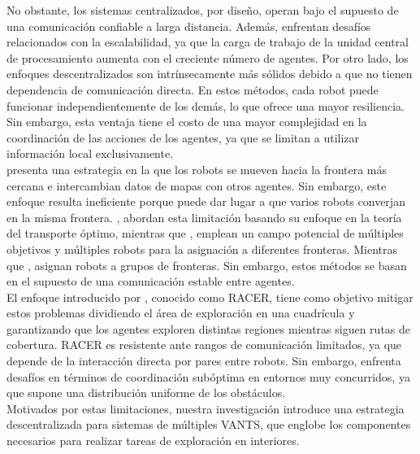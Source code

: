 \documentclass[sigconf]{acmart}
\begin{document}
No obstante, los sistemas centralizados, por diseño, operan bajo el supuesto de una comunicación confiable a larga distancia. Además, enfrentan desafíos relacionados con la escalabilidad, ya que la carga de trabajo de la unidad central de procesamiento aumenta con el creciente número de agentes. Por otro lado, los enfoques descentralizados son intrínsecamente más sólidos debido a que no tienen dependencia de comunicación directa. En estos métodos, cada robot puede funcionar independientemente de los demás, lo que ofrece una mayor resiliencia. Sin embargo, esta ventaja tiene el costo de una mayor complejidad en la coordinación de las acciones de los agentes, ya que se limitan a utilizar información local exclusivamente.\\

\citeauthor{YAMAUCHI1997} \cite{YAMAUCHI1997} presenta una estrategia en la que los robots se mueven hacia la frontera más cercana e intercambian datos de mapas con otros agentes. Sin embargo, este enfoque resulta ineficiente porque puede dar lugar a que varios robots converjan en la misma frontera. \citeauthor{9483227} \cite{9483227}, abordan esta limitación basando su enfoque en la teoría del transporte óptimo, mientras que \citeauthor{9561328} \cite{9561328}, emplean un campo potencial de múltiples objetivos y múltiples robots para la asignación a diferentes fronteras. Mientras que \citeauthor{9561226} \cite{9561226}, asignan robots a grupos de fronteras. Sin embargo, estos métodos se basan en el supuesto de una comunicación estable entre agentes.\\

El enfoque introducido por \citeauthor{RACER2022} \cite{RACER2022}, conocido como RACER, tiene como objetivo mitigar estos problemas dividiendo el área de exploración en una cuadrícula y garantizando que los agentes exploren distintas regiones mientras siguen rutas de cobertura. RACER es resistente ante rangos de comunicación limitados, ya que depende de la interacción directa por pares entre robots. Sin embargo, enfrenta desafíos en términos de coordinación subóptima en entornos muy concurridos, ya que supone una distribución uniforme de los obstáculos.\\

Motivados por estas limitaciones, nuestra investigación introduce una estrategia descentralizada para sistemas de múltiples VANTS, que englobe los componentes necesarios para realizar tareas de exploración en interiores.

\end{document}

